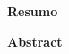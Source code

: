 
\begin{center}
{\Large \bfseries Resumo}
\end{center}


\vspace{4cm}

\begin{center}
{\Large \bfseries Abstract}
\end{center}

